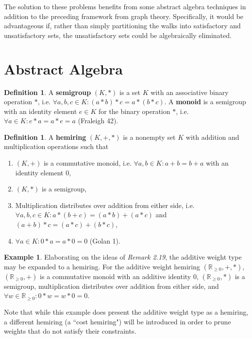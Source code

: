 \documentclass[12pt]{amsart}
\theoremstyle{definition}
\newtheorem{definition}[thm]{Definition}
\newtheorem{example}[thm]{Example}
\theoremstyle{remark}
\numberwithin{equation}{section}
\newcommand{\R}{\mathbb{R}}
\begin{document}
The solution to these problems benefits from some abstract algebra techniques in addition to the preceding framework from graph theory. Specifically, it would be advantageous if, rather than simply partitioning the walks into satisfactory and unsatisfactory sets, the unsatisfactory sets could be algebraically eliminated.

\section{Abstract Algebra}

\begin{definition}
A \textbf{semigroup} $(K, \ast)$ is a set $K$ with an associative binary operation $\ast$, i.e. $\forall a, b, c \in K : (a \ast b) \ast c = a \ast (b \ast c)$. A \textbf{monoid} is a semigroup with an identity element $e \in K$ for the binary operation $\ast$, i.e. $\forall a \in K : e \ast a = a \ast e = a$ (Fraleigh 42).
\end{definition}

\begin{definition}
A \textbf{hemiring} $(K, +, \ast)$ is a nonempty set $K$ with addition and multiplication operations such that
\begin{enumerate}
\item $(K, +)$ is a commutative monoid, i.e. $\forall a, b \in K : a + b = b + a$ with an identity element $0$,
\item $(K, \ast)$ is a semigroup,
\item Multiplication distributes over addition from either side, i.e. $\forall a, b, c \in K : a \ast (b + c) = (a \ast b) + (a \ast c)$ and $(a + b) \ast c = (a \ast c) + (b \ast c)$,
\item  $\forall a \in K : 0 \ast a = a \ast 0 = 0$ (Golan 1).
\end{enumerate}
\end{definition}

\begin{example}
Elaborating on the ideas of \textit{Remark 2.19}, the additive weight type may be expanded to a hemiring. For the additive weight hemiring $(\R_{\ge 0}, +, \ast)$, $(\R_{\ge 0}, +)$ is a commutative monoid with an additive identity $0$, $(\R_{\ge 0}, \ast)$ is a semigroup, multiplication distributes over addition from either side, and $\forall w \in \R_{\ge 0} : 0 \ast w = w \ast 0 = 0$.
\end{example}

Note that while this example does present the additive weight type as a hemiring, a different hemiring (a ``cost hemiring") will be introduced in order to prune weights that do not satisfy their constraints.
\end{document}
